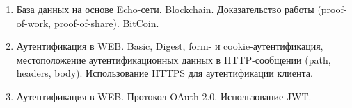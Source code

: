 \begin{enumerate}
    \item База данных на основе Echo-сети. Blockchain. Доказательство работы (proof-of-work, proof-of-share). BitCoin.
    \item Аутентификация в WEB. Basic, Digest, form- и cookie-ау\-тен\-ти\-фи\-ка\-ция, местоположение аутентификационных данных в HTTP-сообщении (path, headers, body). Использование HTTPS для аутентификации клиента.
    \item Аутентификация в WEB. Протокол OAuth 2.0. Использование JWT.

\end{enumerate}
